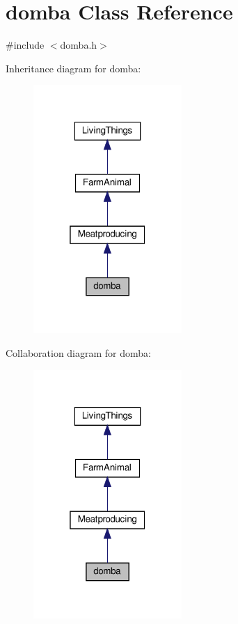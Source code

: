 \hypertarget{classdomba}{}\section{domba Class Reference}
\label{classdomba}


{\ttfamily \#include $<$domba.\+h$>$}



Inheritance diagram for domba\+:
\nopagebreak
\begin{figure}[H]
\begin{center}
\leavevmode
\includegraphics[width=160pt]{classdomba__inherit__graph}
\end{center}
\end{figure}


Collaboration diagram for domba\+:
\nopagebreak
\begin{figure}[H]
\begin{center}
\leavevmode
\includegraphics[width=160pt]{classdomba__coll__graph}
\end{center}
\end{figure}

